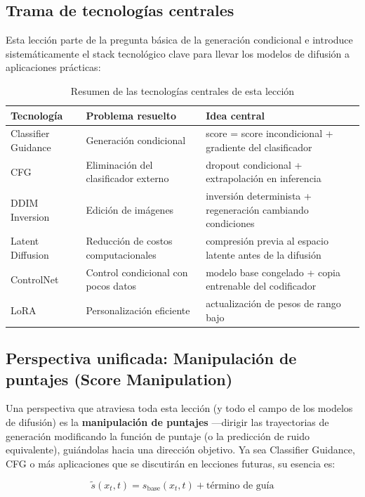 \documentclass[a4paper]{article}
\begin{document}
\subsection{Trama de tecnologías centrales}

Esta lección parte de la pregunta básica de la generación condicional e introduce sistemáticamente el stack tecnológico clave para llevar los modelos de difusión a aplicaciones prácticas:

\begin{table}[H]
\centering
\begin{tabular}{lp{4.5cm}p{4.5cm}}
\toprule
\textbf{Tecnología} & \textbf{Problema resuelto} & \textbf{Idea central} \\
\midrule
Classifier Guidance & Generación condicional & score = score incondicional + gradiente del clasificador \\
CFG & Eliminación del clasificador externo & dropout condicional + extrapolación en inferencia \\
DDIM Inversion & Edición de imágenes & inversión determinista + regeneración cambiando condiciones \\
Latent Diffusion & Reducción de costos computacionales & compresión previa al espacio latente antes de la difusión \\
ControlNet & Control condicional con pocos datos & modelo base congelado + copia entrenable del codificador \\
LoRA & Personalización eficiente & actualización de pesos de rango bajo \\
\bottomrule
\end{tabular}
\caption{Resumen de las tecnologías centrales de esta lección}
\end{table}

\subsection{Perspectiva unificada: Manipulación de puntajes (Score Manipulation)}

Una perspectiva que atraviesa toda esta lección (y todo el campo de los modelos de difusión) es la \textbf{manipulación de puntajes} —dirigir las trayectorias de generación modificando la función de puntaje (o la predicción de ruido equivalente), guiándolas hacia una dirección objetivo. Ya sea Classifier Guidance, CFG o más aplicaciones que se discutirán en lecciones futuras, su esencia es:

$$
\tilde{s}(x_t, t) = s_{\text{base}}(x_t, t) + \text{término de guía}
$$
\end{document}
